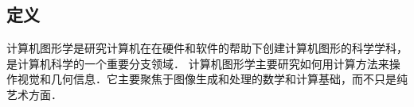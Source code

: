 
\subsection{定义}
计算机图形学是研究计算机在在硬件和软件的帮助下创建计算机图形的科学学科，是计算机科学的一个重要分支领域．
计算机图形学主要研究如何用计算方法来操作视觉和几何信息．它主要聚焦于图像生成和处理的数学和计算基础，而不只是纯艺术方面．